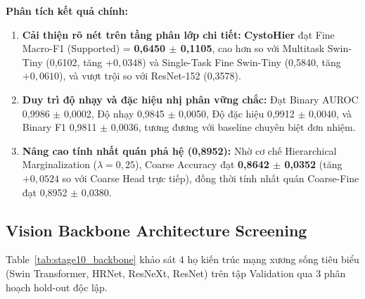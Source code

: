 \documentclass[runningheads]{llncs}
\begin{document}
\textbf{Phân tích kết quả chính:}
\begin{enumerate}
    \item \textbf{Cải thiện rõ nét trên tầng phân lớp chi tiết:} \textbf{CystoHier} đạt Fine Macro-F1 (Supported) = \textbf{0,6450 $\pm$ 0,1105}, cao hơn so với Multitask Swin-Tiny (0,6102, tăng $+0,0348$) và Single-Task Fine Swin-Tiny (0,5840, tăng $+0,0610$), và vượt trội so với ResNet-152 (0,3578).
    \item \textbf{Duy trì độ nhạy và đặc hiệu nhị phân vững chắc:} Đạt Binary AUROC 0,9986 $\pm$ 0,0002, Độ nhạy 0,9845 $\pm$ 0,0050, Độ đặc hiệu 0,9912 $\pm$ 0,0040, và Binary F1 0,9811 $\pm$ 0,0036, tương đương với baseline chuyên biệt đơn nhiệm.
    \item \textbf{Nâng cao tính nhất quán phả hệ (0,8952):} Nhờ cơ chế Hierarchical Marginalization ($\lambda=0{,}25$), Coarse Accuracy đạt \textbf{0,8642 $\pm$ 0,0352} (tăng $+0{,}0524$ so với Coarse Head trực tiếp), đồng thời tính nhất quán Coarse-Fine đạt 0,8952 $\pm$ 0,0380.
\end{enumerate}

\subsection{Vision Backbone Architecture Screening}
Table~\ref{tab:stage10_backbone} khảo sát 4 họ kiến trúc mạng xương sống tiêu biểu (Swin Transformer, HRNet, ResNeXt, ResNet) trên tập Validation qua 3 phân hoạch hold-out độc lập.
\end{document}
